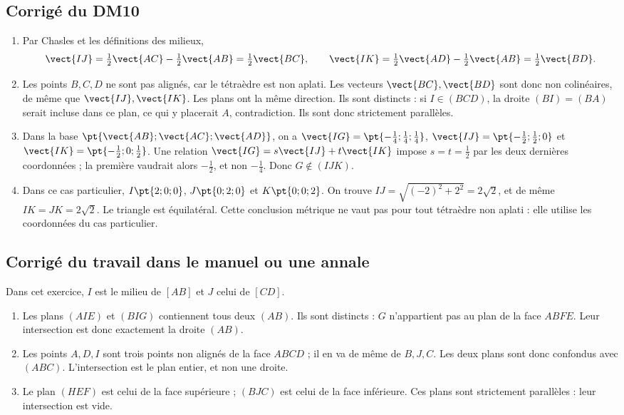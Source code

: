 \subsection{Corrigé du DM10}\begin{enumerate}
\item Par Chasles et les définitions des milieux,
\[\vect{IJ}=\tfrac12\vect{AC}-\tfrac12\vect{AB}=\tfrac12\vect{BC},\qquad \vect{IK}=\tfrac12\vect{AD}-\tfrac12\vect{AB}=\tfrac12\vect{BD}.\]
\item Les points $B,C,D$ ne sont pas alignés, car le tétraèdre est non aplati. Les vecteurs $\vect{BC},\vect{BD}$ sont donc non colinéaires, de même que $\vect{IJ},\vect{IK}$. Les plans ont la même direction. Ils sont distincts : si $I\in(BCD)$, la droite $(BI)=(BA)$ serait incluse dans ce plan, ce qui y placerait $A$, contradiction. Ils sont donc strictement parallèles.
\item Dans la base $\pt{\vect{AB};\vect{AC};\vect{AD}}$, on a $\vect{IG}=\pt{-\frac{1}{4};\frac{1}{4};\frac{1}{4}}$, $\vect{IJ}=\pt{-\frac{1}{2};\frac{1}{2};0}$ et $\vect{IK}=\pt{-\frac{1}{2};0;\frac{1}{2}}$. Une relation $\vect{IG}=s\vect{IJ}+t\vect{IK}$ impose $s=t=\frac{1}{2}$ par les deux dernières coordonnées ; la première vaudrait alors $-\frac{1}{2}$, et non $-\frac{1}{4}$. Donc $G\notin(IJK)$.
\item Dans ce cas particulier, $I\pt{2;0;0}$, $J\pt{0;2;0}$ et $K\pt{0;0;2}$. On trouve $IJ=\sqrt{(-2)^2+2^2}=2\sqrt2$, et de même $IK=JK=2\sqrt2$. Le triangle est équilatéral. Cette conclusion métrique ne vaut pas pour tout tétraèdre non aplati : elle utilise les coordonnées du cas particulier.
\end{enumerate}

\subsection{Corrigé du travail dans le manuel ou une annale}Dans cet exercice, $I$ est le milieu de $[AB]$ et $J$ celui de $[CD]$.
\begin{enumerate}
\item Les plans $(AIE)$ et $(BIG)$ contiennent tous deux $(AB)$. Ils sont distincts : $G$ n'appartient pas au plan de la face $ABFE$. Leur intersection est donc exactement la droite $(AB)$.
\item Les points $A,D,I$ sont trois points non alignés de la face $ABCD$ ; il en va de même de $B,J,C$. Les deux plans sont donc confondus avec $(ABC)$. L'intersection est le plan entier, et non une droite.
\item Le plan $(HEF)$ est celui de la face supérieure ; $(BJC)$ est celui de la face inférieure. Ces plans sont strictement parallèles : leur intersection est vide.
\end{enumerate}

\fi

